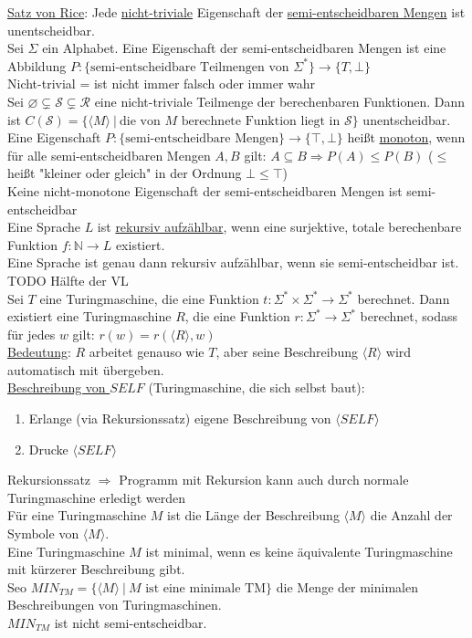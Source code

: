 \documentclass[a4paper]{article}
\newcommand{\ul}{\underline}
\begin{document}
\ul{Satz von Rice}: Jede \ul{nicht-triviale} Eigenschaft der \ul{semi-entscheidbaren Mengen} ist unentscheidbar.\\
Sei $\Sigma$ ein Alphabet. Eine Eigenschaft der semi-entscheidbaren Mengen ist eine Abbildung $P:\{\text{semi-entscheidbare Teilmengen von }\Sigma^*\}\rightarrow\{T,\bot\}$\\
Nicht-trivial = ist nicht immer falsch oder immer wahr\\
Sei $\varnothing\subsetneq\mathcal{S}\subsetneq\mathcal{R}$ eine nicht-triviale Teilmenge der berechenbaren Funktionen. Dann ist $C(\mathcal{S})=\{\langle M\rangle\ \vert\ \text{die von }M\text{ berechnete Funktion liegt in } \mathcal{S}\}$ unentscheidbar.\\
Eine Eigenschaft $P:\{\text{semi-entscheidbare Mengen}\}\rightarrow\{\top,\bot\}$ heißt \ul{monoton}, wenn für alle semi-entscheidbaren Mengen $A,B$ gilt: $A\subseteq B\Rightarrow P(A)\leq P(B)$ ($\leq$ heißt "kleiner oder gleich" in der Ordnung $\bot\leq \top$)\\
Keine nicht-monotone Eigenschaft der semi-entscheidbaren Mengen ist semi-entscheidbar\\
Eine Sprache $L$ ist \ul{rekursiv aufzählbar}, wenn eine surjektive, totale berechenbare Funktion $f:\mathbb{N}\rightarrow L$ existiert.\\
Eine Sprache ist genau dann rekursiv aufzählbar, wenn sie semi-entscheidbar ist.\\
TODO Hälfte der VL\\
Sei $T$ eine Turingmaschine, die eine Funktion $t:\Sigma^*\times\Sigma^*\rightarrow\Sigma^*$ berechnet. Dann existiert eine Turingmaschine $R$, die eine Funktion $r:\Sigma^*\rightarrow\Sigma^*$ berechnet, sodass für jedes $w$ gilt: $r(w)=r(\langle R\rangle, w)$\\
\ul{Bedeutung}: $R$ arbeitet genauso wie $T$, aber seine Beschreibung $\langle R\rangle$ wird automatisch mit übergeben.\\
\ul{Beschreibung von $SELF$} (Turingmaschine, die sich selbst baut):
\begin{enumerate}
	\item Erlange (via Rekursionssatz) eigene Beschreibung von $\langle SELF\rangle$
	\item Drucke $\langle SELF\rangle$
\end{enumerate}
Rekursionssatz $\Rightarrow$ Programm mit Rekursion kann auch durch normale Turingmaschine erledigt werden\\
Für eine Turingmaschine $M$ ist die Länge der Beschreibung $\langle M\rangle$ die Anzahl der Symbole von $\langle M\rangle$.\\
Eine Turingmaschine $M$ ist minimal, wenn es keine äquivalente Turingmaschine mit kürzerer Beschreibung gibt.\\
Seo $MIN_{TM}=\{\langle M\rangle\ \vert\ M\text{ ist eine minimale TM}\}$ die Menge der minimalen Beschreibungen von Turingmaschinen.\\
$MIN_{TM}$ ist nicht semi-entscheidbar.\\
\end{document}

